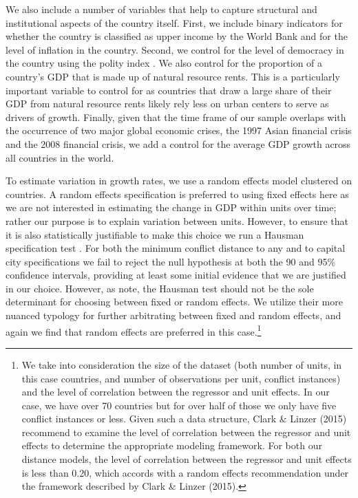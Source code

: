 We also include a number of variables that help to capture structural and institutional aspects of the country itself. First, we include binary indicators for whether the country is classified as upper income by the World Bank and for the level of inflation in the country. Second, we control for the level of democracy in the country using the polity index \citep{marshall:etal:2013}. We also control for the proportion of a country's GDP that is made up of natural resource rents. This is a particularly important variable to control for as countries that draw a large share of their GDP from natural resource rents likely rely less on urban centers to serve as drivers of growth. Finally, given that the time frame of our sample overlaps with the occurrence of two major global economic crises, the 1997 Asian financial crisis and the 2008 financial crisis, we add a control for the average GDP growth across all countries in the world. 

To estimate variation in growth rates, we use a random effects model clustered on countries. A random effects specification is preferred to using fixed effects here as we are not interested in estimating the change in GDP within units over time; rather our purpose is to explain variation between units. However, to ensure that it is also statistically justifiable to make this choice we run a Hausman specification test \citep{greene:2008}. For both the minimum conflict distance to any and to capital city specifications we fail to reject the null hypothesis at both the 90 and 95\% confidence intervals, providing at least some initial evidence that we are justified in our choice. However, as \citet{clark:linzer:2015} note, the Hausman test should not be the sole determinant for choosing between fixed or random effects. We utilize their more nuanced typology for further arbitrating between fixed and random effects, and again we find that random effects are preferred in this case.\footnote{We take into consideration the size of the dataset (both number of units, in this case countries, and number of observations per unit, conflict instances) and the level of correlation between the regressor and unit effects. In our case, we have over 70 countries but for over half of those we only have five conflict instances or less. Given such a data structure, Clark \& Linzer (2015) recommend to examine the level of correlation between the regressor and unit effects to determine the appropriate modeling framework. For both our distance models, the level of correlation between the regressor and unit effects is less than 0.20, which accords with a random effects recommendation under the framework described by Clark \& Linzer (2015).}

